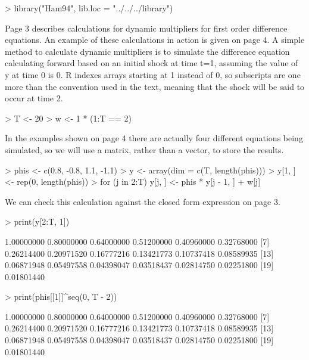 \begin{Schunk}
\begin{Sinput}
> library("Ham94", lib.loc = "../../../library")
\end{Sinput}
\end{Schunk}
Page 3 describes calculations for dynamic multipliers for first order difference equations.  An example of these
calculations in action is given on page 4.  A simple method to calculate dynamic multipliers is to simulate
the difference equation calculating forward based on an initial shock at time t=1, assuming the value of y at time 0 is 0.
R indexes arrays starting at 1 instead of 0, so subscripts are one more than the convention used in the text, meaning that
the shock will be said to occur at time 2.
\begin{Schunk}
\begin{Sinput}
> T <- 20
> w <- 1 * (1:T == 2)
\end{Sinput}
\end{Schunk}
In the examples shown on page 4 there are actually four different equations being simulated,
so we will use a matrix, rather than a vector, to store the results.
\begin{Schunk}
\begin{Sinput}
> phis <- c(0.8, -0.8, 1.1, -1.1)
> y <- array(dim = c(T, length(phis)))
> y[1, ] <- rep(0, length(phis))
> for (j in 2:T) y[j, ] <- phis * y[j - 1, ] + w[j]
\end{Sinput}
\end{Schunk}
We can check this calculation against the closed form expression on page 3.
\begin{Schunk}
\begin{Sinput}
> print(y[2:T, 1])
\end{Sinput}
\begin{Soutput}
 [1] 1.00000000 0.80000000 0.64000000 0.51200000 0.40960000 0.32768000
 [7] 0.26214400 0.20971520 0.16777216 0.13421773 0.10737418 0.08589935
[13] 0.06871948 0.05497558 0.04398047 0.03518437 0.02814750 0.02251800
[19] 0.01801440
\end{Soutput}
\begin{Sinput}
> print(phis[[1]]^seq(0, T - 2))
\end{Sinput}
\begin{Soutput}
 [1] 1.00000000 0.80000000 0.64000000 0.51200000 0.40960000 0.32768000
 [7] 0.26214400 0.20971520 0.16777216 0.13421773 0.10737418 0.08589935
[13] 0.06871948 0.05497558 0.04398047 0.03518437 0.02814750 0.02251800
[19] 0.01801440
\end{Soutput}
\end{Schunk}

